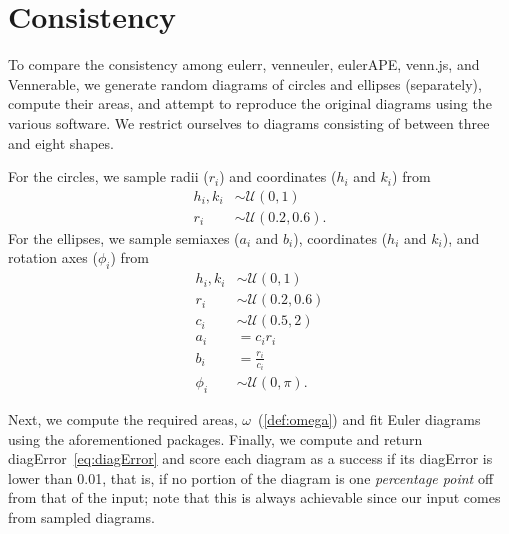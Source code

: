 \documentclass[
  oneside,
  openany,
  numbers=noendperiod,
  parskip=half,
  bibliography=totoc
]{scrbook}\usepackage[]{graphicx}\usepackage{xcolor}
\newcommand{\pkg}[1]{{\fontseries{b}\selectfont #1}}
\begin{document}
\section{Consistency}
\label{sec:consistency}

To compare the consistency among \pkg{eulerr}, \pkg{venneuler}, \pkg{eulerAPE},
\pkg{venn.js}, and \pkg{Vennerable}, we generate random diagrams of circles and
ellipses (separately), compute their areas, and attempt to reproduce the original diagrams
using the various software. We restrict ourselves to
diagrams consisting of between three and eight shapes.

For the circles, we sample radii ($r_i$) and coordinates ($h_i$ and $k_i$) from
\begin{equation}
\begin{aligned}
h_i,k_i & \sim \mathcal{U}(0, 1)\\
r_i     & \sim \mathcal{U}(0.2, 0.6).
\end{aligned}
\label{eq:consistencyCircles}
\end{equation}
For the ellipses, we sample semiaxes ($a_i$ and $b_i$), coordinates
($h_i$ and $k_i$), and rotation axes ($\phi_i$) from
\begin{equation}
\begin{aligned}
h_i,k_i & \sim \mathcal{U}(0, 1)\\
r_i     & \sim \mathcal{U}(0.2, 0.6)\\
c_i     & \sim \mathcal{U}(0.5, 2)\\
a_i     & = c_ir_i\\
b_i     & = \frac{r_i}{c_i}\\
\phi_i  & \sim \mathcal{U}(0, \pi).
\end{aligned}
\label{eq:consistencyEllipses}
\end{equation}

Next, we compute the required areas, $\omega$~(\cref{def:omega})
and fit Euler diagrams using the aforementioned packages. Finally,
we compute and return diagError~\eqref{eq:diagError} and score each
diagram as a success if its diagError is lower than 0.01, that is,
if no portion of the diagram is one \emph{percentage point} off from that of the
input; note that this is always achievable since our input comes
from sampled diagrams.
\end{document}
